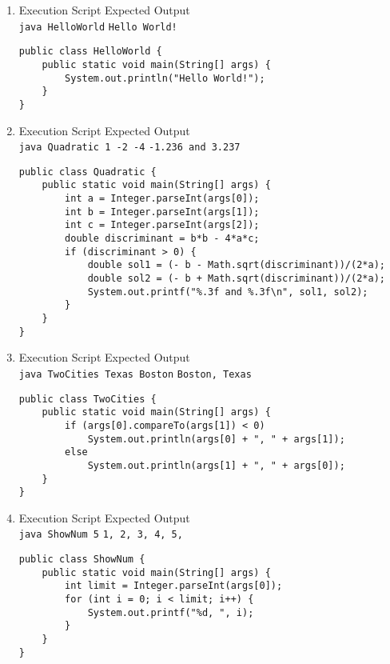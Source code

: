 \documentclass[12pt,letterpaper,twoside]{article}
\begin{document}
\begin{enumerate}[label=\textbf{(\alph*)}]

\item Execution Script \hfill Expected Output\\
\texttt{java HelloWorld} \hfill \texttt{Hello World!}

\lstset{language=Java,tabsize=2}
\begin{lstlisting}
public class HelloWorld {
	public static void main(String[] args) {
		System.out.println("Hello World!");
	}
}
\end{lstlisting}

\item Execution Script \hfill Expected Output\\
\texttt{java Quadratic 1 -2 -4} \hfill \texttt{-1.236 and 3.237}

\lstset{language=Java,tabsize=2}
\begin{lstlisting}
public class Quadratic {
	public static void main(String[] args) {
		int a = Integer.parseInt(args[0]);
		int b = Integer.parseInt(args[1]);
		int c = Integer.parseInt(args[2]);
		double discriminant = b*b - 4*a*c;
		if (discriminant > 0) {
			double sol1 = (- b - Math.sqrt(discriminant))/(2*a);
			double sol2 = (- b + Math.sqrt(discriminant))/(2*a);
			System.out.printf("%.3f and %.3f\n", sol1, sol2);
		}
	}
}
\end{lstlisting}

\item Execution Script \hfill Expected Output\\
\texttt{java TwoCities Texas Boston} \hfill \texttt{Boston, Texas}

\lstset{language=Java,tabsize=2}
\begin{lstlisting}
public class TwoCities {
	public static void main(String[] args) {
		if (args[0].compareTo(args[1]) < 0)
			System.out.println(args[0] + ", " + args[1]);
		else
			System.out.println(args[1] + ", " + args[0]);
	}
}
\end{lstlisting}

\newpage

\item Execution Script \hfill Expected Output\\
\texttt{java ShowNum 5} \hfill \texttt{1, 2, 3, 4, 5, }

\lstset{language=Java,tabsize=2}
\begin{lstlisting}
public class ShowNum {
	public static void main(String[] args) {
		int limit = Integer.parseInt(args[0]);
		for (int i = 0; i < limit; i++) {
			System.out.printf("%d, ", i);
		}
	}
}
\end{lstlisting}

\end{enumerate}
\end{document}
